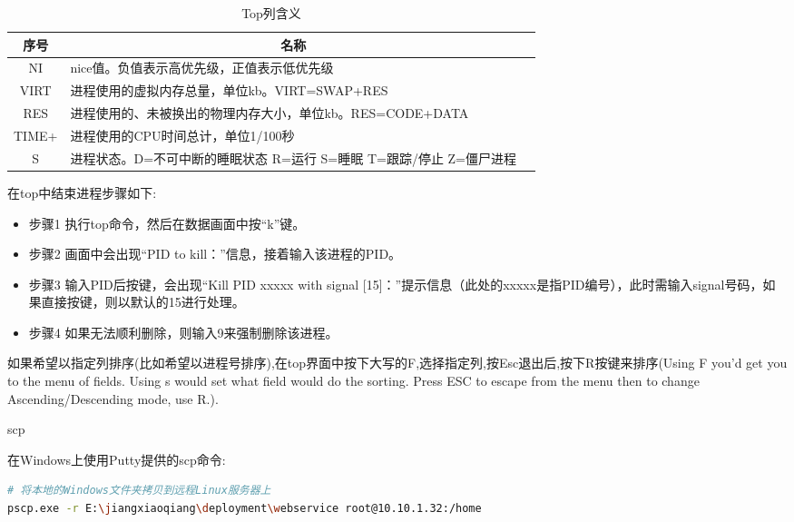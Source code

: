 \documentclass[12pt]{book}
\makeatletter
\numberwithin{dummy}{section}
\theoremstyle{ocrenumbox}
\theoremstyle{blacknumex}
\theoremstyle{blacknumbox}
\theoremstyle{ocrenum}
\renewcommand\paragraph{\@startsection{paragraph}{4}{\z@}
	{-2ex \@plus-.2ex \@minus .2ex}
	{.1ex}
	{\normalfont\small\sffamily\bfseries}}
\makeatother
\begin{document}
\begin{table}
	\caption{Top列含义}
	\label{table:topcolumns}
	\begin{center}
	\begin{tabular}{cp{10cm}c}
		\hline
		\multirow{1}{*}{序号}
		& \multicolumn{1}{c}{名称}  \\
		\hline			
		NI & nice值。负值表示高优先级，正值表示低优先级 \\
		\hline	
		VIRT & 进程使用的虚拟内存总量，单位kb。VIRT=SWAP+RES \\
		\hline
		RES & 进程使用的、未被换出的物理内存大小，单位kb。RES=CODE+DATA \\
		\hline
		TIME+ & 进程使用的CPU时间总计，单位1/100秒 \\
		\hline
		S & 进程状态。D=不可中断的睡眠状态 R=运行 S=睡眠 T=跟踪/停止 Z=僵尸进程 \\
		\hline		
	\end{tabular}	
	\end{center}
\end{table}

在top中结束进程步骤如下:

\begin{itemize}
	\item{步骤1 执行top命令，然后在数据画面中按“k”键。}
	\item{步骤2 画面中会出现“PID to kill：”信息，接着输入该进程的PID。}
	\item{步骤3 输入PID后按键，会出现“Kill PID xxxxx with signal [15]：”提示信息（此处的xxxxx是指PID编号），此时需输入signal号码，如果直接按键，则以默认的15进行处理。}
	\item{步骤4 如果无法顺利删除，则输入9来强制删除该进程。}
\end{itemize}

如果希望以指定列排序(比如希望以进程号排序),在top界面中按下大写的F,选择指定列,按Esc退出后,按下R按键来排序(Using F you'd get you to the menu of fields. Using s would set what field would do the sorting. Press ESC to escape from the menu then to change Ascending/Descending mode, use R.).

\paragraph{scp}

在Windows上使用Putty提供的scp命令:

\begin{lstlisting}[language=Bash]
# 将本地的Windows文件夹拷贝到远程Linux服务器上
pscp.exe -r E:\jiangxiaoqiang\deployment\webservice root@10.10.1.32:/home
\end{lstlisting}
\end{document}
